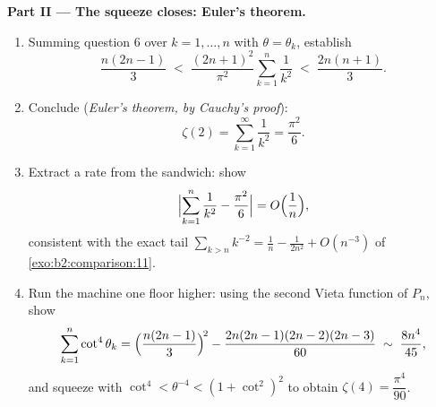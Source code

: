\begin{problem}[{Weekend problem --- $\zeta(2) = \pi^2/6$ and the
Bertrand panorama}]
\medskip
\noindent\textbf{Part II --- The squeeze closes: Euler's
theorem.}
\begin{enumerate}[resume]
  \item Summing question 6 over $k = 1, \dots, n$ with $\theta =
        \theta_k$, establish
        \[
        \frac{n(2n-1)}{3} \;<\;
        \frac{(2n+1)^2}{\pi^2}\sum_{k=1}^{n}\frac1{k^2}
        \;<\; \frac{2n(n+1)}{3}.
        \]
  \item Conclude (\emph{Euler's theorem, by Cauchy's proof}):
        \[
        \zeta(2) = \sum_{k=1}^{\infty}\frac{1}{k^2} =
        \frac{\pi^2}{6}.
        \]
  \item Extract a rate from the sandwich: show
        \[
        \Bigl|\sum_{k=1}^{n}\frac1{k^2} - \frac{\pi^2}6\Bigr|
        = O\Bigl(\frac1n\Bigr),
        \]
        consistent with the exact tail $\sum_{k>n}k^{-2} =
        \frac1n - \frac{1}{2n^2} + O(n^{-3})$ of
        \cref{exo:b2:comparison:11}.
  \item Run the machine one floor higher: using the second Vieta
        function of $P_n$, show
        \[
        \sum_{k=1}^{n}\cot^4\theta_k =
        \Bigl(\frac{n(2n-1)}3\Bigr)^{\!2} -
        \frac{2n(2n-1)(2n-2)(2n-3)}{60}
        \;\sim\; \frac{8n^4}{45},
        \]
        and squeeze with $\cot^4 < \theta^{-4} < (1 +
        \cot^2)^2$ to obtain $\zeta(4) = \dfrac{\pi^4}{90}$.
\end{enumerate}


\end{problem}

